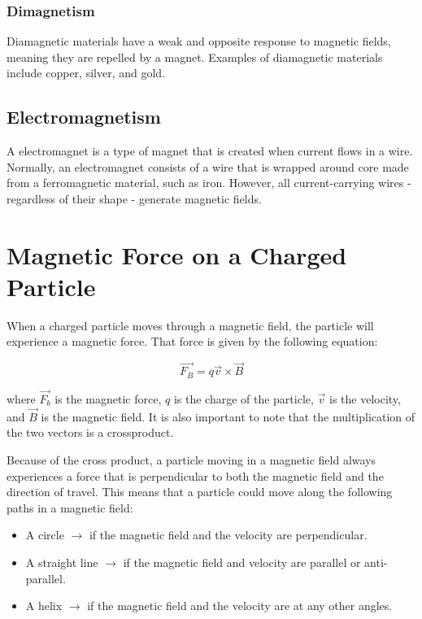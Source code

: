 			\subsubsection{Dimagnetism}  Diamagnetic materials have a weak and opposite response to magnetic fields, meaning they are repelled by a magnet. Examples of diamagnetic materials include copper, silver, and gold.
			
			
		\subsection{Electromagnetism}
		A \gls{electromagnet} is a type of magnet that is created when current flows in a wire.  Normally, an electromagnet consists of a wire that is wrapped around core made from a ferromagnetic material, such as iron.  However, all current-carrying wires - regardless of their shape - generate magnetic fields. 
		
	\section{Magnetic Force on a Charged Particle}
	
	When a charged particle moves through a magnetic field, the particle will experience a magnetic force.  That force is given by the following equation:
	
	
	\begin{mdframed}[backgroundcolor=orange!20!white]
		\begin{equation}
			\overrightarrow{F_B} = q \vec{v} \times \vec{B}
			\label{eqn:magforceparticle}
		\end{equation}
	\end{mdframed}
	where $\overrightarrow{F_b}$ is the magnetic force, $q$ is the charge of the particle, $\vec{v}$ is the velocity, and $\vec{B}$ is the magnetic field.  It is also important to note that the multiplication of the two vectors is a \gls{crossproduct}.
	
	Because of the cross product, a particle moving in a magnetic field always experiences a force that is perpendicular to both the magnetic field and the direction of travel.  This means that a particle could move along the following paths in a magnetic field:
	\begin{itemize}
		\item A circle $\longrightarrow$ if the magnetic field and the velocity are perpendicular.
		\item A straight line $\longrightarrow$ if the magnetic field and velocity are parallel or anti-parallel. 
		\item A helix $\longrightarrow$ if the magnetic field and the velocity are at any other angles.  
	\end{itemize}
	
